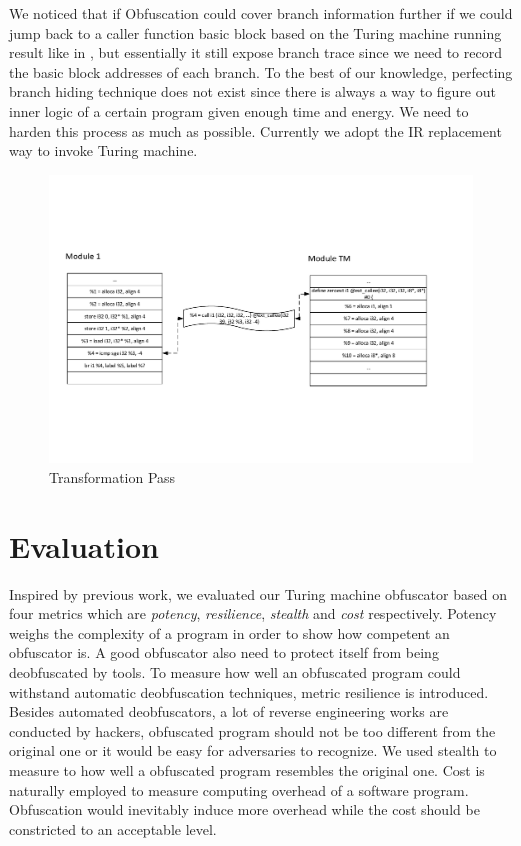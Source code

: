 \documentclass[lnicst]{svmultln}
\begin{document}
We noticed that if Obfuscation could cover branch information further if we could jump back to a caller function basic block based on the Turing machine running result like in \cite{Ma}, but essentially it still expose branch trace since we need to record the basic block addresses of each branch. To the best of our knowledge, perfecting branch hiding technique does not exist since there is always a way to figure out inner logic of a certain program given enough time and energy. We need to harden this process as much as possible. Currently we adopt the IR replacement way to invoke Turing machine.
\begin{figure}
 \includegraphics[width=\linewidth]{transform_pass.pdf}
 \caption{Transformation Pass}
 \label{Figure 6}
\end{figure}

\section{Evaluation}
Inspired by previous work\cite{Collberg}, we evaluated our Turing machine obfuscator based on four metrics which are \textit{potency}, \textit{resilience}, \textit{stealth} and \textit{cost} respectively. Potency weighs the complexity of a program in order to show how competent an obfuscator is. A good obfuscator also need to protect itself from being deobfuscated by tools. To measure how well an obfuscated program could withstand automatic deobfuscation techniques, metric resilience is introduced. Besides automated deobfuscators, a lot of reverse engineering works are conducted by hackers, obfuscated program should not be too different from the original one or it would be easy for adversaries to recognize. We used stealth to measure to how well a obfuscated program resembles the original one. Cost is naturally employed to measure computing overhead of a software program. Obfuscation would inevitably induce more overhead while the cost should be constricted to an acceptable level.
\end{document}
